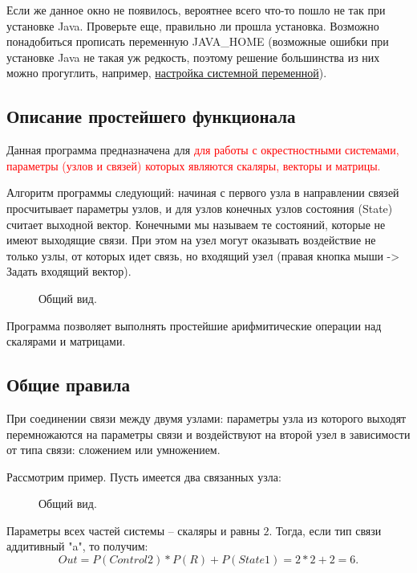 \documentclass{article}
\numberwithin{equation}{section}
\begin{document}
Если же данное окно не появилось, вероятнее всего что-то пошло не так при установке Java. Проверьте еще, правильно ли прошла установка. Возможно понадобиться прописать переменную JAVA\_HOME (возможные ошибки при установке Java не такая уж редкость, поэтому решение большинства из них можно прогуглить, например, \href{https://www.java.com/ru/download/help/path.xml}{настройка системной переменной}).

\subsection{Описание простейшего функционала}
\qquad Данная программа предназначена для \textcolor{red}{для работы с окрестностными системами, параметры (узлов и связей) которых являются скаляры, векторы и матрицы.}

Алгоритм программы следующий: начиная с первого узла в направлении связей просчитывает параметры узлов, и для узлов конечных узлов состояния (State) считает выходной вектор. Конечными мы называем те состояний, которые не имеют выходящие связи. При этом на узел могут оказывать воздействие не только узлы, от которых идет связь, но входящий узел (правая кнопка мыши -> Задать входящий вектор).



\begin{figure}[h]
\caption{Общий вид.}
\label{ris:image2}
\end{figure}


Программа позволяет выполнять простейшие арифмитические операции над скалярами и матрицами.

\subsection{Общие правила} 

	\qquad При соединении связи между двумя узлами: параметры узла из которого выходят перемножаются на параметры связи и воздействуют на второй узел в зависимости от типа связи: сложением или умножением.

	
Рассмотрим пример. Пусть имеется два связанных узла:
	
	\begin{figure}[h]
\caption{Общий вид.}
\label{ris:image3}
\end{figure}
	
	
Параметры всех частей системы -- скаляры и равны $2$. 	Тогда, если тип связи аддитивный "a", то получим:
$$
Out = P(Control2) * P(R) + P(State1) = 2 * 2 + 2 = 6.
$$
 
\end{document}
